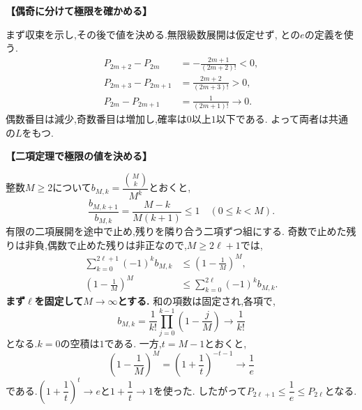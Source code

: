 \begin{enumerate}[label=\textbf{問\arabic*.},leftmargin=3.8em,format=\bookitemlink{practice-entrance}{solution}{problem}]
                  \par\smallskip\noindent\textbf{【偶奇に分けて極限を確かめる】}\par\nopagebreak[4]
                  まず収束を示し,その後で値を決める.無限級数展開は仮定せず,
                  との$e$の定義を使う.
                  \[
                  \begin{aligned}
                    P_{2m+2}-P_{2m}&=-\frac{2m+1}{(2m+2)!}<0,\\
                    P_{2m+3}-P_{2m+1}&=\frac{2m+2}{(2m+3)!}>0,\\
                    P_{2m}-P_{2m+1}&=\frac1{(2m+1)!}\longrightarrow0.
                  \end{aligned}
                  \]
                  偶数番目は減少,奇数番目は増加し,確率は$0$以上$1$以下である.
                  よって両者は共通の$L$をもつ.
                  \par\smallskip\noindent\textbf{【二項定理で極限の値を決める】}\par\nopagebreak[4]
                  整数$M\ge2$について$b_{M,k}=\dfrac{\binom Mk}{M^k}$とおくと,
                  \[
                    \frac{b_{M,k+1}}{b_{M,k}}=\frac{M-k}{M(k+1)}\le1
                    \quad(0\le k<M).
                  \]
                  有限の二項展開を途中で止め,残りを隣り合う二項ずつ組にする.
                  奇数で止めた残りは非負,偶数で止めた残りは非正なので,$M\ge2\ell+1$では,
                  \[
                  \begin{aligned}
                    \sum_{k=0}^{2\ell+1}(-1)^kb_{M,k}
                      &\le\left(1-\frac1M\right)^M,\\
                    \left(1-\frac1M\right)^M
                      &\le\sum_{k=0}^{2\ell}(-1)^kb_{M,k}.
                  \end{aligned}
                  \]
                  \textbf{まず$\ell$を固定して$M\to\infty$とする.}
                  和の項数は固定され,各項で,
                  \[
                    b_{M,k}=\frac1{k!}\prod_{j=0}^{k-1}\left(1-\frac jM\right)
                      \longrightarrow\frac1{k!}
                  \]
                  となる.$k=0$の空積は$1$である.
                  一方,$t=M-1$とおくと,
                  \[
                    \left(1-\frac1M\right)^M=\left(1+\frac1t\right)^{-t-1}
                      \longrightarrow\frac1e
                  \]
                  である.$\left(1+\dfrac{1}{t}\right)^t\to e$と$1+\dfrac{1}{t}\to1$を使った.
                  したがって$P_{2\ell+1}\le\dfrac{1}{e}\le P_{2\ell}$となる.

\end{enumerate}
